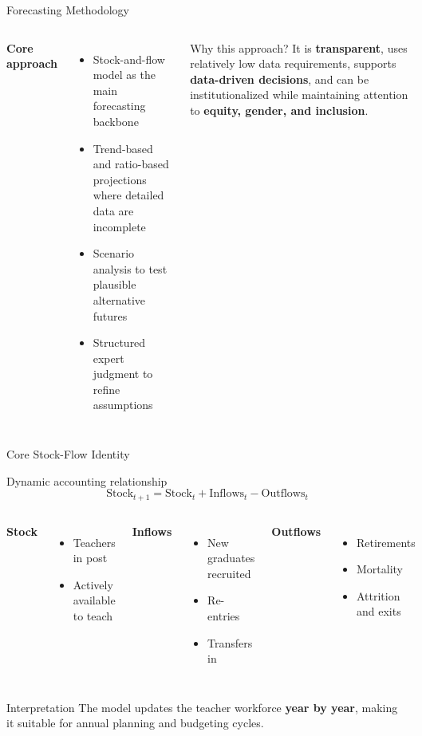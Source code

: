 \documentclass[
  11pt,
  ignorenonframetext,
  aspectratio=169,
  11pt]{beamer}
\newcommand{\highlight}[1]{\textcolor{DavidsonBlueDark}{\textbf{#1}}}
\begin{document}
\begin{frame}{Forecasting Methodology}
\begin{columns}[T,onlytextwidth]
\textbf{Core approach}
\begin{itemize}
  \item Stock-and-flow model as the main forecasting backbone
  \item Trend-based and ratio-based projections where detailed data are incomplete
  \item Scenario analysis to test plausible alternative futures
  \item Structured expert judgment to refine assumptions
\end{itemize}
\begin{block}{Why this approach?}
\justifying
It is \highlight{transparent}, uses relatively low data requirements, supports \highlight{data-driven decisions}, and can be institutionalized while maintaining attention to \highlight{equity, gender, and inclusion}.
\end{block}
\end{columns}
\end{frame}

\begin{frame}{Core Stock-Flow Identity}
\begin{block}{Dynamic accounting relationship}
\[
\mathrm{Stock}_{t+1} = \mathrm{Stock}_{t} + \mathrm{Inflows}_{t} - \mathrm{Outflows}_{t}
\]
\end{block}
\vspace{0.15cm}
\begin{columns}[T,onlytextwidth]
\textbf{Stock}
\begin{itemize}
  \item Teachers in post
  \item Actively available to teach
\end{itemize}
\textbf{Inflows}
\begin{itemize}
  \item New graduates recruited
  \item Re-entries
  \item Transfers in
\end{itemize}
\textbf{Outflows}
\begin{itemize}
  \item Retirements
  \item Mortality
  \item Attrition and exits
\end{itemize}
\end{columns}
\vspace{0.2cm}
\begin{block}{Interpretation}
The model updates the teacher workforce \highlight{year by year}, making it suitable for annual planning and budgeting cycles.
\end{block}
\end{frame}
\end{document}
